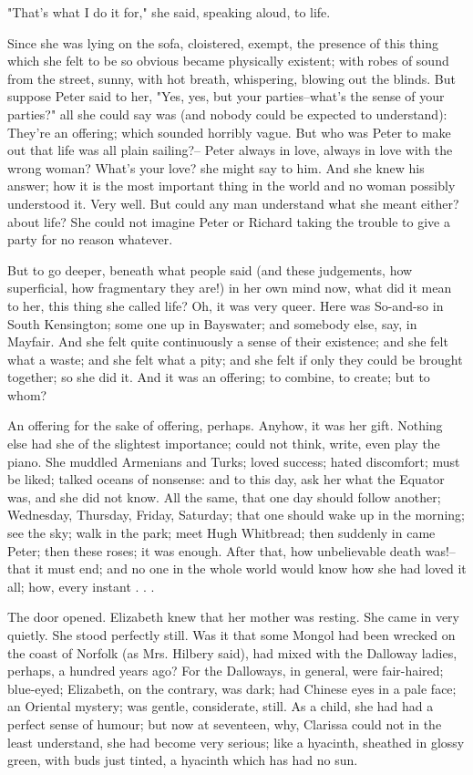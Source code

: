 \documentclass[lang=cn,10pt]{elegantbook}
\begin{document}
"That's what I do it for," she said, speaking aloud, to life.

Since she was lying on the sofa, cloistered, exempt, the presence
of this thing which she felt to be so obvious became physically
existent; with robes of sound from the street, sunny, with hot
breath, whispering, blowing out the blinds.  But suppose Peter said
to her, "Yes, yes, but your parties--what's the sense of your
parties?" all she could say was (and nobody could be expected to
understand):  They're an offering; which sounded horribly vague.
But who was Peter to make out that life was all plain sailing?--
Peter always in love, always in love with the wrong woman?  What's
your love? she might say to him.  And she knew his answer; how it
is the most important thing in the world and no woman possibly
understood it.  Very well.  But could any man understand what she
meant either? about life?  She could not imagine Peter or Richard
taking the trouble to give a party for no reason whatever.

But to go deeper, beneath what people said (and these judgements,
how superficial, how fragmentary they are!) in her own mind now,
what did it mean to her, this thing she called life?  Oh, it was
very queer.  Here was So-and-so in South Kensington; some one up in
Bayswater; and somebody else, say, in Mayfair.  And she felt quite
continuously a sense of their existence; and she felt what a waste;
and she felt what a pity; and she felt if only they could be
brought together; so she did it.  And it was an offering; to
combine, to create; but to whom?

An offering for the sake of offering, perhaps.  Anyhow, it was her
gift.  Nothing else had she of the slightest importance; could not
think, write, even play the piano.  She muddled Armenians and
Turks; loved success; hated discomfort; must be liked; talked
oceans of nonsense: and to this day, ask her what the Equator was,
and she did not know.  All the same, that one day should follow
another; Wednesday, Thursday, Friday, Saturday; that one should
wake up in the morning; see the sky; walk in the park; meet Hugh
Whitbread; then suddenly in came Peter; then these roses; it was
enough.  After that, how unbelievable death was!--that it must end;
and no one in the whole world would know how she had loved it all;
how, every instant . . .

The door opened.  Elizabeth knew that her mother was resting.  She
came in very quietly.  She stood perfectly still.  Was it that some
Mongol had been wrecked on the coast of Norfolk (as Mrs. Hilbery
said), had mixed with the Dalloway ladies, perhaps, a hundred years
ago?  For the Dalloways, in general, were fair-haired; blue-eyed;
Elizabeth, on the contrary, was dark; had Chinese eyes in a pale
face; an Oriental mystery; was gentle, considerate, still.  As a
child, she had had a perfect sense of humour; but now at seventeen,
why, Clarissa could not in the least understand, she had become
very serious; like a hyacinth, sheathed in glossy green, with buds
just tinted, a hyacinth which has had no sun.
\end{document}
